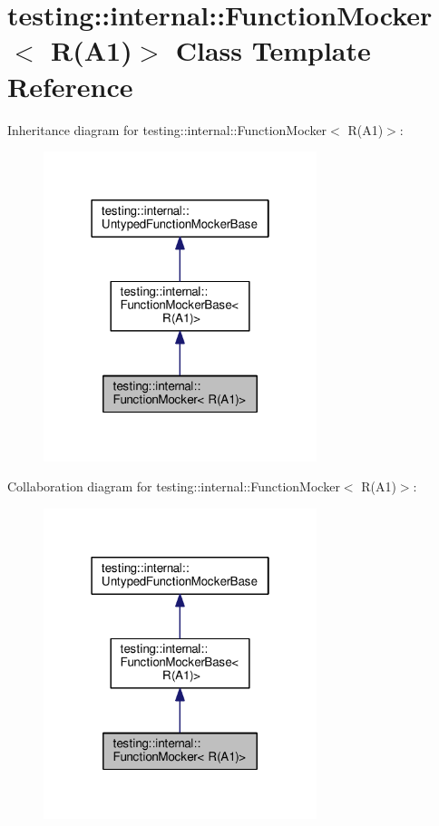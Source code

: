 \hypertarget{classtesting_1_1internal_1_1FunctionMocker_3_01R_07A1_08_4}{}\section{testing\+:\+:internal\+:\+:Function\+Mocker$<$ R(A1)$>$ Class Template Reference}
\label{classtesting_1_1internal_1_1FunctionMocker_3_01R_07A1_08_4}


Inheritance diagram for testing\+:\+:internal\+:\+:Function\+Mocker$<$ R(A1)$>$\+:\nopagebreak
\begin{figure}[H]
\begin{center}
\leavevmode
\includegraphics[width=226pt]{classtesting_1_1internal_1_1FunctionMocker_3_01R_07A1_08_4__inherit__graph}
\end{center}
\end{figure}


Collaboration diagram for testing\+:\+:internal\+:\+:Function\+Mocker$<$ R(A1)$>$\+:\nopagebreak
\begin{figure}[H]
\begin{center}
\leavevmode
\includegraphics[width=226pt]{classtesting_1_1internal_1_1FunctionMocker_3_01R_07A1_08_4__coll__graph}
\end{center}
\end{figure}
